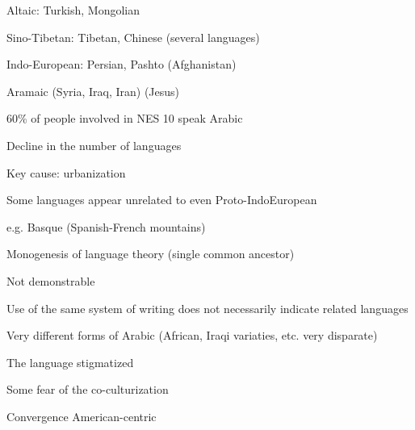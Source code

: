 \documentclass[12pt]{article}
\begin{document}
Altaic: Turkish, Mongolian

Sino-Tibetan: Tibetan, Chinese (several languages)

Indo-European: Persian, Pashto (Afghanistan)

Aramaic (Syria, Iraq, Iran) (Jesus)

60\% of people involved in NES 10 speak Arabic

\noindent
Decline in the number of languages

Key cause: urbanization

\noindent
Some languages appear unrelated to even Proto-IndoEuropean

e.g. Basque (Spanish-French mountains)

\noindent
Monogenesis of language theory (single common ancestor)

Not demonstrable

\noindent
Use of the same system of writing does not necessarily indicate related languages

\noindent
Very different forms of Arabic (African, Iraqi variaties, etc. very disparate)

The language stigmatized

\noindent
Some fear of the co-culturization

Convergence American-centric
\end{document}
